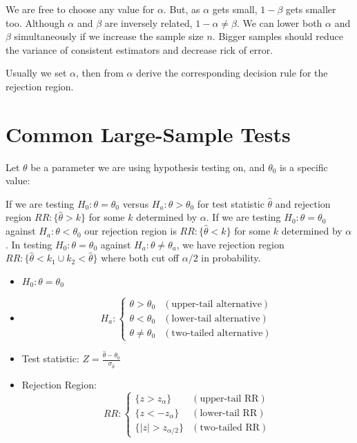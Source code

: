 \documentclass[12pt, a4paper, twoside, openright, titlepage]{book}
\begin{document}
\begin{rmk}{}{}
    We are free to choose any value for $\alpha$. But, as $\alpha$ gets small, $1-\beta$ gets smaller too. Although $\alpha$ and $\beta$ are inversely related, $1-\alpha \neq \beta$. We can lower both $\alpha$ and $\beta$ simultaneously if we increase the sample size $n$. Bigger samples should reduce the variance of consistent estimators and decrease rick of error.
\end{rmk}

Usually we set $\alpha$, then from $\alpha$ derive the corresponding decision rule for the rejection region.


\section{\textsection Common Large-Sample Tests}

Let $\theta$ be a parameter we are using hypothesis testing on, and $\theta_0$ is a specific value:

If we are testing $H_0: \theta = \theta_0$ versus $H_a:\theta > \theta_0$ for test statistic $\hat{\theta}$ and rejection region $RR:\{\hat{\theta} > k\}$ for some $k$ determined by $\alpha$. If we are testing $H_0: \theta = \theta_0$ against $H_a:\theta < \theta_0$ our rejection region is $RR:\{\hat{\theta} < k\}$ for some $k$ determined by $\alpha$. In testing $H_0:\theta = \theta_0$ against $H_a:\theta \neq \theta_a$, we have rejection region $RR:\{\hat{\theta} < k_1\cup k_2 < \hat{\theta}\}$ where both cut off $\alpha/2$ in probability.

\begin{summ}{}{}
    \leavevmode
    \begin{itemize}
        \item $H_0:\theta = \theta_0$
        \item \begin{equation*}
                H_a:\left\{\begin{array}{cc} \theta > \theta_0 & (\text{upper-tail alternative}) \\ \theta < \theta_0 & (\text{lower-tail alternative}) \\ \theta\neq \theta_0 & (\text{two-tailed alternative}) \end{array}\right.
        \end{equation*}
        \item Test statistic: $Z = \frac{\hat{\theta} - \theta_0}{\sigma_{\hat{\theta}}}$
        \item Rejection Region: \begin{equation*}
                RR: \left\{\begin{array}{cc} \{z > z_{\alpha}\} & (\text{upper-tail RR}) \\ \{z < -z_{\alpha}\} & (\text{lower-tail RR}) \\ \{|z| > z_{\alpha/2}\} & (\text{two-tailed RR}) \end{array}\right.
        \end{equation*}
    \end{itemize}
\end{summ}
\end{document}
